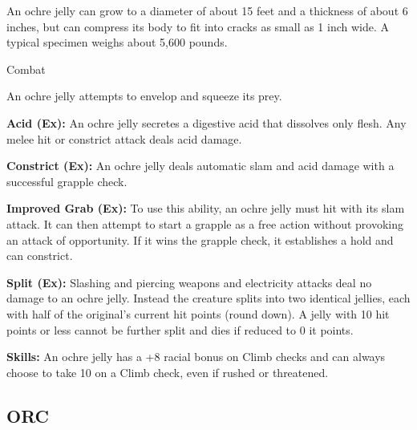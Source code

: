 \documentclass{article}
\begin{document}
An ochre jelly can grow to a diameter of about 15 feet and a thickness of about 
6 inches, but can compress its body to fit into cracks as small as 1 inch wide. 
A typical specimen weighs about 5,600 pounds.

Combat

An ochre jelly attempts to envelop and squeeze its prey.

\textbf{Acid (Ex):} An ochre jelly secretes a digestive acid that dissolves only 
flesh. Any melee hit or constrict attack deals acid damage.

\textbf{Constrict (Ex): }An ochre jelly deals automatic slam and acid damage with 
a successful grapple check.

\textbf{Improved Grab (Ex): }To use this ability, an ochre jelly must hit with 
its slam attack. It can then attempt to start a grapple as a free action without 
provoking an attack of opportunity. If it wins the grapple check, it establishes 
a hold and can constrict.

\textbf{Split (Ex):} Slashing and piercing weapons and electricity attacks deal 
no damage to an ochre jelly. Instead the creature splits into two identical jellies, 
each with half of the original's current hit points (round down). A jelly with 
10 hit points or less cannot be further split and dies if reduced to 0 it points.

\textbf{Skills:} An ochre jelly has a +8 racial bonus on Climb checks and can always 
choose to take 10 on a Climb check, even if rushed or threatened.

\vspace{12pt}
\subsection*{{\LARGE{}ORC}}
\end{document}
